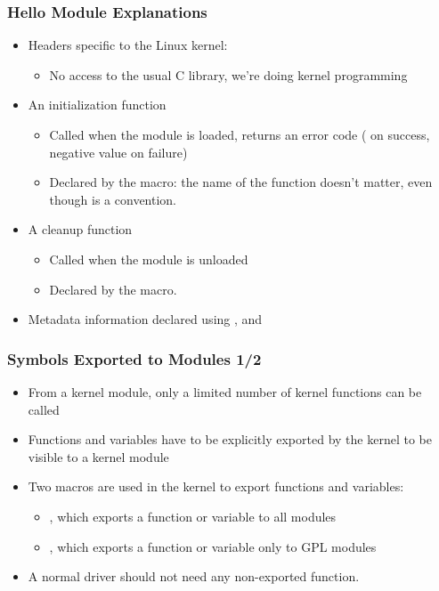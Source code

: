 \begin{frame}
  \frametitle{Hello Module Explanations}
  \begin{itemize}
  \item Headers specific to the Linux kernel: 
    \begin{itemize}
    \item No access to the usual C library, we're doing kernel
      programming
    \end{itemize}
  \item An initialization function
    \begin{itemize}
    \item Called when the module is loaded, returns an error code
      ( on success, negative value on failure)
    \item Declared by the  macro: the name of the
      function doesn't matter, even though 
      is a convention.
    \end{itemize}
  \item A cleanup function
    \begin{itemize}
    \item Called when the module is unloaded
    \item Declared by the  macro.
    \end{itemize}
  \item Metadata information declared using ,
     and 
  \end{itemize}
\end{frame}

\begin{frame}
  \frametitle{Symbols Exported to Modules 1/2}
  \begin{itemize}
  \item From a kernel module, only a limited number of kernel
    functions can be called
  \item Functions and variables have to be explicitly exported by the
    kernel to be visible to a kernel module
  \item Two macros are used in the kernel to export functions and
    variables:
    \begin{itemize}
    \item {}, which exports a function
      or variable to all modules
    \item {}, which exports a
      function or variable only to GPL modules
    \end{itemize}
  \item A normal driver should not need any non-exported function.
  \end{itemize}
\end{frame}

